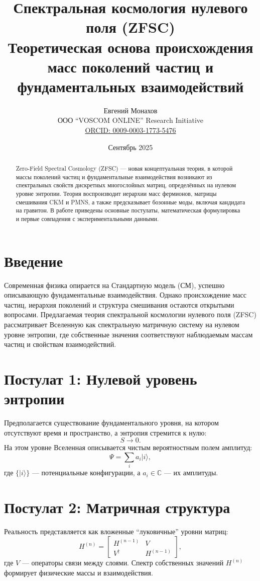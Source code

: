 \documentclass[12pt,a4paper]{article}
\title{Спектральная космология нулевого поля (ZFSC) \\
\large Теоретическая основа происхождения масс поколений частиц и фундаментальных взаимодействий}
\author{Евгений Монахов \\
ООО ``VOSCOM ONLINE'' Research Initiative \\
\href{https://orcid.org/0009-0003-1773-5476}{ORCID: 0009-0003-1773-5476}}
\date{Сентябрь 2025}
\begin{document}
\maketitle

\begin{abstract}
Zero-Field Spectral Cosmology (ZFSC) --- новая концептуальная теория, в которой массы поколений частиц и фундаментальные взаимодействия возникают из спектральных свойств дискретных многослойных матриц, определённых на нулевом уровне энтропии.
Теория воспроизводит иерархии масс фермионов, матрицы смешивания CKM и PMNS, а также предсказывает бозонные моды, включая кандидата на гравитон. 
В работе приведены основные постулаты, математическая формулировка и первые совпадения с экспериментальными данными.
\end{abstract}

\section{Введение}
Современная физика опирается на Стандартную модель (СМ), успешно описывающую фундаментальные взаимодействия. 
Однако происхождение масс частиц, иерархия поколений и структура смешивания остаются открытыми вопросами. 
Предлагаемая теория спектральной космологии нулевого поля (ZFSC) рассматривает Вселенную как спектральную матричную систему на нулевом уровне энтропии, где собственные значения соответствуют наблюдаемым массам частиц и свойствам взаимодействий.

\section{Постулат 1: Нулевой уровень энтропии}
Предполагается существование фундаментального уровня, на котором отсутствуют время и пространство, а энтропия стремится к нулю:
\[
S \to 0.
\]
На этом уровне Вселенная описывается чистым вероятностным полем амплитуд:
\[
\Psi = \sum_{i} a_i |i\rangle ,
\]
где $\{|i\rangle\}$ --- потенциальные конфигурации, а $a_i \in \mathbb{C}$ --- их амплитуды.

\section{Постулат 2: Матричная структура}
Реальность представляется как вложенные ``луковичные'' уровни матриц:
\[
H^{(n)} =
\begin{bmatrix}
H^{(n-1)} & V \\
V^\dagger & H^{(n-1)}
\end{bmatrix},
\]
где $V$ --- операторы связи между слоями.
Спектр собственных значений $H^{(n)}$ формирует физические массы и взаимодействия.
\end{document}
